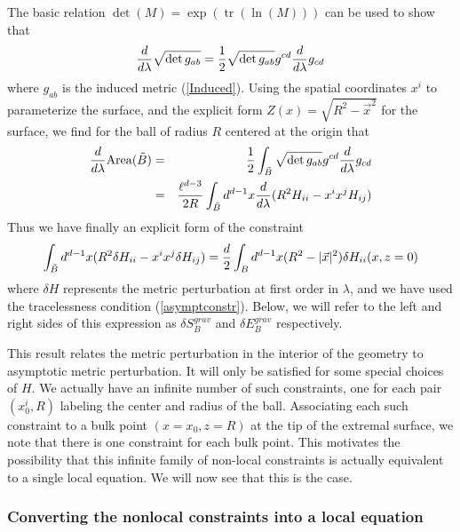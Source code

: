 \documentclass[12pt,epsf]{article}
\newcommand{\be}{\begin{equation}}
\newcommand{\ee}{\end{equation}}
\newcommand{\bea}{\begin{eqnarray}}
\newcommand{\eea}{\end{eqnarray}}
\newcommand{\tr}{\operatorname{tr}}
\begin{document}
The basic relation $\det(M) = \exp(\tr(\ln(M)))$ can be used to show that
\be
{d \over d \lambda} \sqrt{\det{g_{ab}}} = {1 \over 2}  \sqrt{\det{g_{ab}}} g^{cd} {d \over d \lambda} g_{cd}
\ee
where $g_{ab}$ is the induced metric (\ref{Induced}). Using the spatial coordinates $x^i$ to parameterize the surface, and the explicit form $Z(x) = \sqrt{R^2-\vec{x}^2}$ for the surface, we find for the ball of radius $R$ centered at the origin that
\bea
{d \over d \lambda} {\rm Area}(\tilde{B}) &=& {1 \over 2} \int_{\tilde{B}}  \sqrt{\det{g_{ab}}} g^{cd} {d \over d \lambda} g_{cd} \cr
&=& {\ell^{d-3} \over 2 R} \int_{\tilde{B}} d^{d-1} x {d \over d \lambda}(R^2 H_{ii} - x^i x^j H_{ij})
\eea
Thus we have finally an explicit form of the constraint
\be
\label{firstlaw_grav}
\int_{\tilde{B}} d^{d-1} x (R^2 \delta H_{ii} - x^i x^j \delta H_{ij}) = {d  \over 2 } \int_B d^{d-1} x (R^2 - |\vec{x}|^2) \delta H_{ii}(x,z=0)
\ee
where $\delta H$ represents the metric perturbation at first order in $\lambda$, and we have used the tracelessness condition (\ref{asymptconstr}). Below, we will refer to the left and right sides of this expression as $\delta S^{grav}_B$ and $\delta E^{grav}_B$ respectively.

This result relates the metric perturbation in the interior of the geometry to asymptotic metric perturbation. It will only be satisfied for some special choices of $H$. We actually have an infinite number of such constraints, one for each pair $(x_0^i,R)$ labeling the center and radius of the ball. Associating each such constraint to a bulk point $(x = x_0, z = R)$ at the tip of the extremal surface, we note that there is one constraint for each bulk point. This motivates the possibility that this infinite family of non-local constraints is actually equivalent to a single local equation. We will now see that this is the case.

\subsubsection*{Converting the nonlocal constraints into a local equation}
\end{document}
